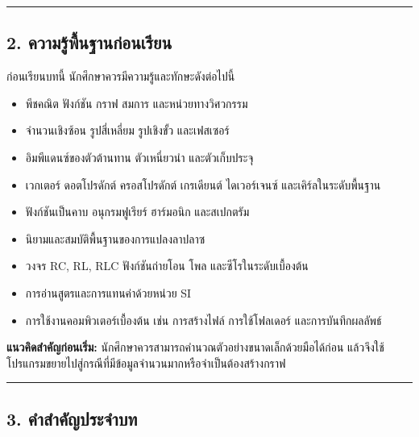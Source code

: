 \par\noindent\rule{\textwidth}{0.4pt}\par

\subsection{2. ความรู้พื้นฐานก่อนเรียน}

ก่อนเรียนบทนี้ นักศึกษาควรมีความรู้และทักษะดังต่อไปนี้

\begin{itemize}
    \item พีชคณิต ฟังก์ชัน กราฟ สมการ และหน่วยทางวิศวกรรม
    \item จำนวนเชิงซ้อน รูปสี่เหลี่ยม รูปเชิงขั้ว และเฟสเซอร์
    \item อิมพีแดนซ์ของตัวต้านทาน ตัวเหนี่ยวนำ และตัวเก็บประจุ
    \item เวกเตอร์ ดอตโปรดักต์ ครอสโปรดักต์ เกรเดียนต์ ไดเวอร์เจนซ์ และเคิร์ลในระดับพื้นฐาน
    \item ฟังก์ชันเป็นคาบ อนุกรมฟูเรียร์ ฮาร์มอนิก และสเปกตรัม
    \item นิยามและสมบัติพื้นฐานของการแปลงลาปลาซ
    \item วงจร RC, RL, RLC ฟังก์ชันถ่ายโอน โพล และซีโรในระดับเบื้องต้น
    \item การอ่านสูตรและการแทนค่าด้วยหน่วย SI
    \item การใช้งานคอมพิวเตอร์เบื้องต้น เช่น การสร้างไฟล์ การใช้โฟลเดอร์ และการบันทึกผลลัพธ์
\end{itemize}

\textbf{แนวคิดสำคัญก่อนเริ่ม:} นักศึกษาควรสามารถคำนวณตัวอย่างขนาดเล็กด้วยมือได้ก่อน แล้วจึงใช้โปรแกรมขยายไปสู่กรณีที่มีข้อมูลจำนวนมากหรือจำเป็นต้องสร้างกราฟ

\par\noindent\rule{\textwidth}{0.4pt}\par

\subsection{3. คำสำคัญประจำบท}

